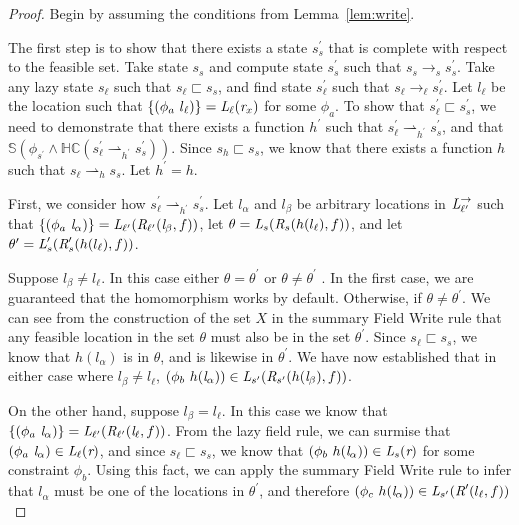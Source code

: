 \begin{proof}
Begin by assuming the conditions from Lemma~\ref{lem:write}.

The first step is to show that there exists a state $s_s^\prime$ that is complete with respect to the feasible set. Take state $s_s$ and compute state $s_s^\prime$ such that $s_s \rightarrow_s s_s^\prime$. Take any lazy state $s_\ell$ such that $s_\ell \sqsubset s_s$, and find state $s_\ell^\prime$ such that $s_\ell \rightarrow_\ell s_\ell^\prime$. Let $l_\ell$ be the location such that $\{(\phi_a\ l_\ell )\} = \emph{L}_\ell(\emph{r}_x) $ for some $\phi_a$. To show that $s_\ell^\prime \sqsubset s_s^\prime$, we need to demonstrate that there exists a function $h^\prime$ such that $s_\ell^\prime \rightharpoonup_{h^\prime} s_s^\prime$, and that $\mathbb{S}(\phi_{s^\prime} \wedge \mathbb{HC}(s_\ell^\prime \rightharpoonup_{h^\prime} s_s^\prime) )$. Since $s_h \sqsubset s_s$, we know that there exists a function $h$ such that $s_\ell \rightharpoonup_{h} s_s$. Let $h^\prime = h$. 

First, we consider how $s_\ell^\prime \rightharpoonup_{h^\prime} s_s^\prime$. Let $l_\alpha$ and $l_\beta$ be arbitrary locations in $\emph{L}_{\ell^\prime}^\rightarrow$ such that $\{(\phi_a\ \emph{l}_\alpha)\} = \emph{L}_{\ell^\prime}(\emph{R}_{\ell^\prime}(\emph{l}_\beta,f ))$, let $\theta = \emph{L}_s(\emph{R}_s(h(l_\ell),f))$, and let $\theta^\prime =   \emph{L}_s^\prime(\emph{R}_s^\prime(h(l_\ell),f))$. 

Suppose $l_\beta \neq l_\ell$. In this case either $\theta = \theta^\prime$ or $\theta \neq \theta^\prime$ . In the first case, we are guaranteed that the homomorphism works by default. Otherwise, if $\theta \neq \theta^\prime$.  We can see from the construction of the set $X$ in the summary Field Write rule that any feasible location in the set $\theta$ must also be in the set $\theta^\prime$. Since $s_\ell \sqsubset s_s$, we know that $h(l_\alpha)$ is in $\theta$, and is likewise in $\theta^\prime$. We have now established that in either case where $l_\beta \neq l_\ell$, $(\phi_b\ h(\emph{l}_\alpha))\in \emph{L}_{s^\prime}(\emph{R}_{s^\prime} (h(\emph{l}_\beta),f ))$.

On the other hand, suppose $l_\beta = l_\ell$. In this case we know that $\{(\phi_a\ \cfgnt{l}_\alpha)\} = \cfgnt{L}_{\ell^\prime}(\cfgnt{R}_{\ell^\prime}(\cfgnt{l}_\ell,f ))$. From the lazy field rule, we can surmise that $(\phi_a\ \emph{l}_\alpha) \in \emph{L}_{\ell}(\emph{r} )$, and since $s_\ell \sqsubset s_s$, we know that $(\phi_b\ h(\emph{l}_\alpha)) \in \emph{L}_{s}(\emph{r})$ for some constraint $\phi_b$. Using this fact, we can apply the summary Field Write rule to infer that $l_\alpha$ must be one of the locations in $\theta^\prime$, and therefore $(\phi_c\ h(\emph{l}_\alpha)) \in \emph{L}_{s^\prime}(\emph{R}^\prime(l_\ell,f))$


\end{proof}
